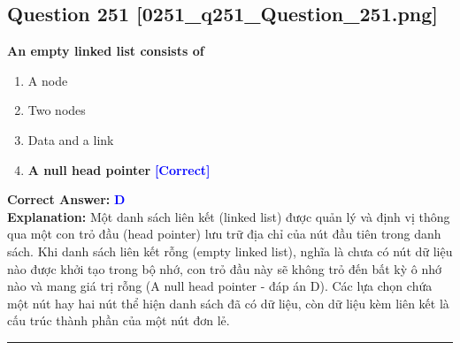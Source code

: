\documentclass[11pt,a4paper]{article}
\begin{document}
\begin{minipage}{\textwidth}
\subsection*{Question 251 \quad \footnotesize{[0251\_q251\_Question\_251.png]}}
\noindent \textbf{An empty linked list consists of}

\begin{enumerate}[label=\Alph*.]
    \item A node
    \item Two nodes
    \item Data and a link
    \item \textbf{A null head pointer} \hfill \textcolor{blue}{\textbf{[Correct]}}
\end{enumerate}

\noindent \textbf{Correct Answer:} \textcolor{blue}{\textbf{D}} \\[2pt]
\noindent \textbf{Explanation:} Một danh sách liên kết (linked list) được quản lý và định vị thông qua một con trỏ đầu (head pointer) lưu trữ địa chỉ của nút đầu tiên trong danh sách. Khi danh sách liên kết rỗng (empty linked list), nghĩa là chưa có nút dữ liệu nào được khởi tạo trong bộ nhớ, con trỏ đầu này sẽ không trỏ đến bất kỳ ô nhớ nào và mang giá trị rỗng (A null head pointer - đáp án D). Các lựa chọn chứa một nút hay hai nút thể hiện danh sách đã có dữ liệu, còn dữ liệu kèm liên kết là cấu trúc thành phần của một nút đơn lẻ.

\par\vspace{0.3cm}
\hrule
\vspace{0.3cm}
\end{minipage}
\end{document}
